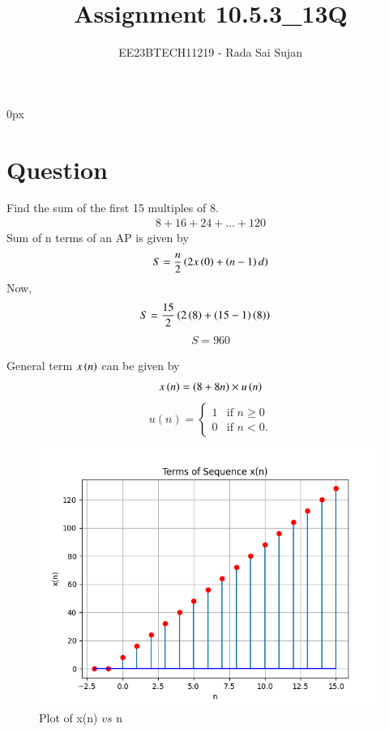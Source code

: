 \documentclass[journal,12pt,twocolumn]{IEEEtran}
\theoremstyle{remark}
\begin{document}
\parindent 0px

\title{Assignment 10.5.3\_13Q}
\author{EE23BTECH11219 - Rada Sai Sujan$^{}$%
}
\maketitle
\newpage
\bigskip
\section*{Question}
Find the sum of the first 15 multiples of 8. \\
\solution
\begin{align}
    8+16+24+\ldots+120
\end{align}
Sum of n terms of an AP is given by  \\
\begin{align}
    S=\dfrac{n}{2}\left(2x\left(0\right)+\left(n-1\right)d\right)
\end{align}
Now,
\begin{align}
    S &=\dfrac{15}{2}\left(2\left(8\right)+\left(15-1\right)\left(8\right)\right)   
\end{align}
\begin{align}
    \boxed{S =960}
\end{align}

General term $x\left(n\right)$ can be given by
\begin{align}
    x\left(n\right)=\left(8+8n\right) \times u\left(n\right)  \label{eq5}
\end{align}
\[ u(n) = \begin{cases}
        1 & \text{if } n \geq 0 \\
        0 & \text{if }  n< 0.
            \end{cases}\]
    \begin{figure}[htbp]
        \centering
        \includegraphics[width=\columnwidth]{figs/a.png}
        \caption{Plot of x(n) $vs$ n}
        \label{fig:1}
    \end{figure}
\end{document}
